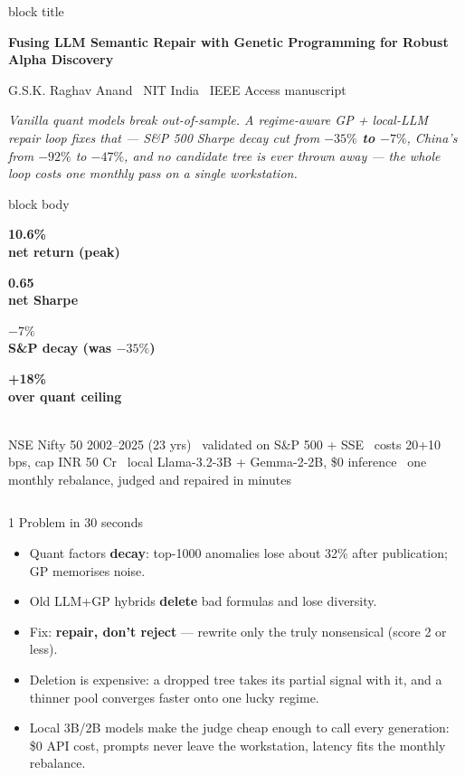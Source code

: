 \documentclass[final]{beamer}
\newcommand{\hl}[1]{\textbf{\textcolor{navy2}{#1}}}
\newcommand{\kpi}[3]{%
  \begin{minipage}[t]{0.235\linewidth}\centering
    {\color{#3}\fontsize{30}{30}\selectfont\bfseries #1}\\[0.08cm]
    {\small\bfseries #2}%
  \end{minipage}%
}
\begin{document}
\begin{frame}[t]
\begin{beamercolorbox}[wd=\textwidth,leftskip=1.2cm,rightskip=1.2cm,sep=0.55cm]{block title}
\centering
{\fontsize{44}{46}\selectfont\bfseries Fusing LLM Semantic Repair with Genetic Programming for Robust Alpha Discovery\par}
\vspace{0.25cm}
{\Large G.S.K. Raghav Anand \textbullet\ NIT India \textbullet\ IEEE Access manuscript\par}
\vspace{0.2cm}
{\large\itshape Vanilla quant models break out-of-sample. A regime-aware GP + local-LLM repair loop fixes that --- S\&P 500 Sharpe decay cut from \textbf{$-35\%$ to $-7\%$}, China's from $-92\%$ to $-47\%$, and no candidate tree is ever thrown away --- the whole loop costs one monthly pass on a single workstation.}
\end{beamercolorbox}
\vskip0.3cm
\begin{beamercolorbox}[wd=\textwidth,leftskip=0.8cm,rightskip=0.8cm,sep=0.35cm]{block body}
\centering
\kpi{10.6\%}{net return (peak)}{good}\hfill
\kpi{0.65}{net Sharpe}{navy2}\hfill
\kpi{$-7\%$}{S\&P decay (was $-35\%$)}{good}\hfill
\kpi{+18\%}{over quant ceiling}{accent2}\\[0.1cm]
{\small NSE Nifty 50 2002--2025 (23 yrs) \textbullet\ validated on S\&P 500 + SSE \textbullet\ costs 20+10 bps, cap INR 50 Cr \textbullet\ local Llama-3.2-3B + Gemma-2-2B, \$0 inference \textbullet\ one monthly rebalance, judged and repaired in minutes}
\end{beamercolorbox}
\vskip0.2cm
\begin{columns}[t,onlytextwidth]
\begin{block}{1 Problem in 30 seconds}
\begin{itemize}
  \item Quant factors \hl{decay}: top-1000 anomalies lose about 32\% after publication; GP memorises noise.
  \item Old LLM+GP hybrids \hl{delete} bad formulas and lose diversity.
  \item Fix: \hl{repair, don't reject} --- rewrite only the truly nonsensical (score 2 or less).
  \item Deletion is expensive: a dropped tree takes its partial signal with it, and a thinner pool converges faster onto one lucky regime.
  \item Local 3B/2B models make the judge cheap enough to call every generation: \$0 API cost, prompts never leave the workstation, latency fits the monthly rebalance.

\end{itemize}
\end{block}
\end{columns}
\end{frame}
\end{document}
